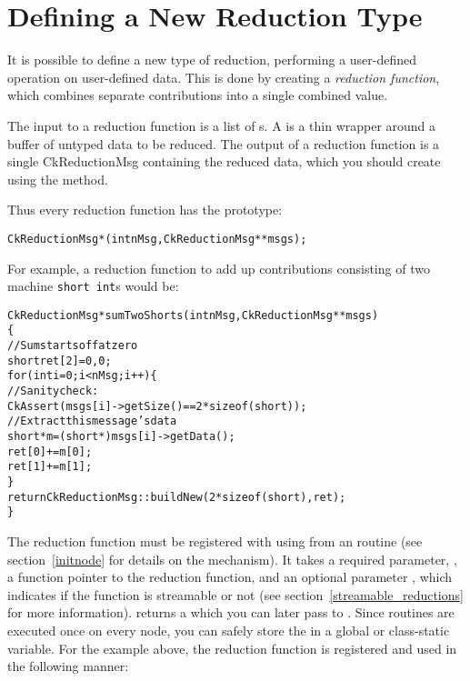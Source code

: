 \section{Defining a New Reduction Type}

\label{new_type_reduction}

It is possible to define a new type of reduction, performing a 
user-defined operation on user-defined data.  This is done by 
creating a {\em reduction function}, which 
combines separate contributions 
into a single combined value.

The input to a reduction function is a list of s.
A  is a thin wrapper around a buffer of untyped data
to be reduced.  
The output of a reduction function is a single CkReductionMsg
containing the reduced data, which you should create using the
 method.  

Thus every reduction function has the prototype:
\begin{alltt}
CkReductionMsg *(int nMsg,CkReductionMsg **msgs);
\end{alltt}

For example, a reduction function to add up contributions 
consisting of two machine {\tt short int}s would be:

\begin{alltt}
CkReductionMsg *sumTwoShorts(int nMsg,CkReductionMsg **msgs)
\{
  //Sum starts off at zero
  short ret[2]={0,0};
  for (int i=0;i<nMsg;i++) \{
    //Sanity check:
    CkAssert(msgs[i]->getSize()==2*sizeof(short));
    //Extract this message's data
    short *m=(short *)msgs[i]->getData();
    ret[0]+=m[0];
    ret[1]+=m[1];
  \}
  return CkReductionMsg::buildNew(2*sizeof(short),ret);
\}
\end{alltt}

The reduction function must be registered with \charmpp{} 
using  from
an  routine (see section~\ref{initnode} for details
on the  mechanism). It takes a required parameter,
, a function pointer to the reduction function, and
an optional parameter , which indicates if the
function is streamable or not (see section~\ref{streamable_reductions}
for more information).  returns a
 which you can later
pass to .  Since  routines are executed
once on every node, you can safely store the 
in a global or class-static variable.  For the example above, the reduction
function is registered and used in the following manner:

